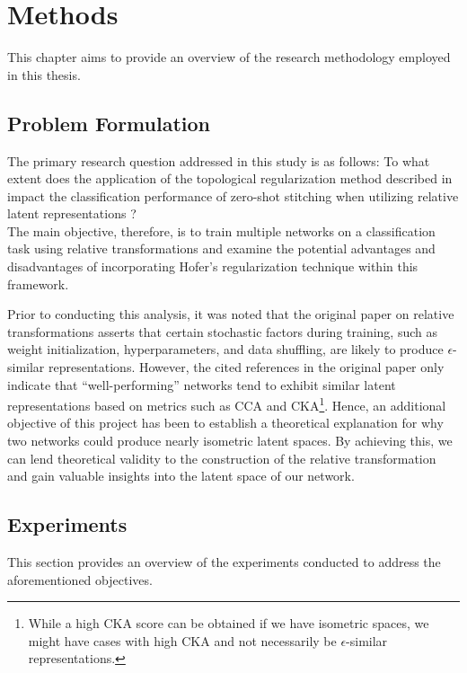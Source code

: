 \documentclass[../main.tex]{subfiles}
\begin{document}
\chapter{Methods}
\label{ch:methods}

This chapter aims to provide an overview of the research methodology employed in this thesis.

\section{Problem Formulation}
The primary research question addressed in this study is as follows: To what extent does the application of the topological regularization method described in \cite{hofer_densified_2021} impact the classification performance of zero-shot stitching when utilizing relative latent representations \cite{moschella_relative_2022}?\\

The main objective, therefore, is to train multiple networks on a classification task using relative transformations and examine the potential advantages and disadvantages of incorporating Hofer's regularization technique within this framework.

Prior to conducting this analysis, it was noted that the original paper on relative transformations \cite{moschella_relative_2022} asserts that certain stochastic factors during training, such as weight initialization, hyperparameters, and data shuffling, are likely to produce $\epsilon$-similar representations. However, the cited references in the original paper only indicate that ``well-performing'' networks tend to exhibit similar latent representations based on metrics such as CCA and CKA\footnote{While a high CKA score can be obtained if we have isometric spaces, we might have cases with high CKA and not necessarily be $\epsilon$-similar representations.}. Hence, an additional objective of this project has been to establish a theoretical explanation for why two networks could produce nearly isometric latent spaces. By achieving this, we can lend theoretical validity to the construction of the relative transformation and gain valuable insights into the latent space of our network.

\section{Experiments}
This section provides an overview of the experiments conducted to address the aforementioned objectives.
\end{document}
